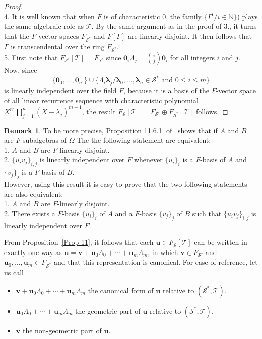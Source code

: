 \documentclass[12pt]{amsart}
\theoremstyle{definition}
\newtheorem{remark}[thrm]{Remark}
\numberwithin{equation}{section}
\numberwithin{equation}{section}
\begin{document}
\begin{proof}
\\4. It is well known that when $F$ is of characteristic $0$, the family $\{\Gamma^{i}/ i\in \mathbb{N}\}$) plays the same algebraic role as $\mathcal{T}$. By the same argument as in the proof of 3., it turns that the $F$-vector spaces $F_{\mathcal{S}^{\ast}}$ and $F[\Gamma]$ are linearly disjoint. It then follows that $\Gamma$ is transcendental over the ring $F_{\mathcal{S}^{\ast}}$.
\\5. First note that $F_{\mathcal{S}^{\circ}}[\mathcal{T}]=F_{\mathcal{S}^{\circ}}$ since $\pmb{0}_{i}\Lambda_{j}=\binom{i}{j}\pmb{0}_{i}$ for all integers $i$ and $j$. Now, since $$\{\pmb{0}_{0},\ldots,\pmb{0}_{n'}\}\cup\{\Lambda_{i}\pmb{\lambda}_{j}/\pmb{\lambda}_{0},\ldots,\pmb{\lambda}_{n}\in \mathcal{S}^{\ast} \,\,\text{and}\,\, 0\leqslant i\leqslant m\}$$ is linearly independent over the field $F$, because it is a basis of the $F$-vector space of all linear recurrence sequence with characteristic polynomial $X^{n'}\displaystyle\prod_{j=1}^{n}(X-\lambda_{j})^{m+1}$, the result $F_{\mathcal{S}}[\mathcal{T}]=F_{\mathcal{S}^{\circ}}\oplus F_{\mathcal{S}^{\ast}}[\mathcal{T}]$ follows.
\end{proof}
\begin{remark} To be more precise, Proposition 11.6.1. of~\cite{Cohn} shows that if $A$ and $B$ are $F$-subalgebras of $\Omega$ The the following statement are equivalent:
\\1. $A$ and $B$ are $F$-linearly disjoint.
\\2. $\{u_{i}v_{j}\}_{i,j}$ is linearly independent over $F$ whenever $\{u_{i}\}_{i}$ is a $F$-basis of $A$ and $\{v_{j}\}_{j}$ is a $F$-basis of $B$.
\\However, using this result it is easy to prove that the two following statements are also equivalent:
\\1. $A$ and $B$ are $F$-linearly disjoint.
\\2. There exists a $F$-basis $\{u_{i}\}_{i}$ of $A$ and a $F$-basis $\{v_{j}\}_{j}$ of $B$ such that $\{u_{i}v_{j}\}_{i,j}$ is linearly independent over $F$.
\end{remark}
From Proposition~\ref{Prop 11}, it follows that each $\pmb{u}\in F_{\mathcal{S}}[\mathcal{T}]$ can be written in exactly one way as $\pmb{u}=\pmb{v}+\pmb{u}_{0}\Lambda_{0} + \cdots + \pmb{u}_{m}\Lambda_{m}$, in which $\pmb{v}\in F_{\mathcal{S}^{\circ}}$ and $\pmb{u}_{0},\ldots,\pmb{u}_{m}\in F_{\mathcal{S}^{\ast}}$ and that this representation is canonical. For ease of reference, let us call
\begin{itemize}
\item $\pmb{v}+\pmb{u}_{0}\Lambda_{0} + \cdots + \pmb{u}_{m}\Lambda_{m}$ the canonical form of $\pmb{u}$ relative to $(\mathcal{S}^{\ast}, \mathcal{T})$.
\item $\pmb{u}_{0}\Lambda_{0} + \cdots + \pmb{u}_{m}\Lambda_{m}$ the geometric part of $\pmb{u}$ relative to $(\mathcal{S}^{\ast}, \mathcal{T})$.
\item $\pmb{v}$ the non-geometric part of $\pmb{u}$.
\end{itemize}
\end{document}
